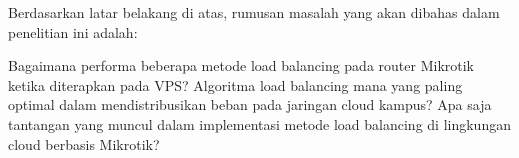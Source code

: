 Berdasarkan latar belakang di atas, rumusan masalah yang akan dibahas dalam penelitian ini adalah:

    Bagaimana performa beberapa metode load balancing pada router Mikrotik ketika diterapkan pada VPS?
    Algoritma load balancing mana yang paling optimal dalam mendistribusikan beban pada jaringan cloud kampus?
    Apa saja tantangan yang muncul dalam implementasi metode load balancing di lingkungan cloud berbasis Mikrotik?
